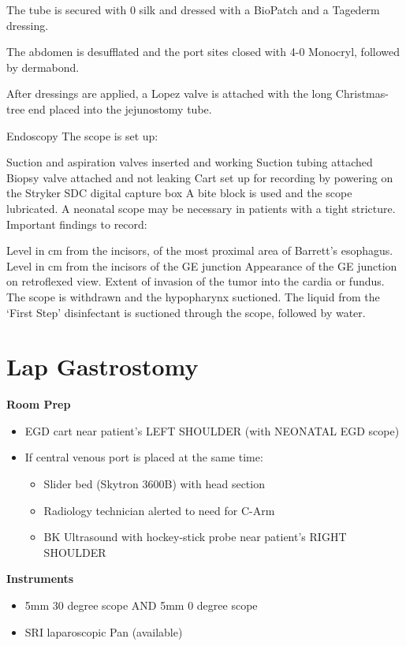 \documentclass[
]{book}
\providecommand{\tightlist}{%
  \setlength{\itemsep}{0pt}\setlength{\parskip}{0pt}}
\begin{document}
The tube is secured with 0 silk and dressed with a BioPatch and a Tagederm dressing.

The abdomen is desufflated and the port sites closed with 4-0 Monocryl, followed by dermabond.

After dressings are applied, a Lopez valve is attached with the long Christmas-tree end placed into the jejunostomy tube.

Endoscopy
The scope is set up:

Suction and aspiration valves inserted and working
Suction tubing attached
Biopsy valve attached and not leaking
Cart set up for recording by powering on the Stryker SDC digital capture box
A bite block is used and the scope lubricated. A neonatal scope may be necessary in patients with a tight stricture. Important findings to record:

Level in cm from the incisors, of the most proximal area of Barrett's esophagus.
Level in cm from the incisors of the GE junction
Appearance of the GE junction on retroflexed view. Extent of invasion of the tumor into the cardia or fundus.
The scope is withdrawn and the hypopharynx suctioned. The liquid from the `First Step' disinfectant is suctioned through the scope, followed by water.

\hypertarget{lap_gastrostomy_salo}{%
\chapter{Lap Gastrostomy}\label{lap_gastrostomy_salo}}

\textbf{Room Prep}

\begin{itemize}
\tightlist
\item
  EGD cart near patient's LEFT SHOULDER (with NEONATAL EGD scope)
\item
  If central venous port is placed at the same time:

  \begin{itemize}
  \tightlist
  \item
    Slider bed (Skytron 3600B) with head section
  \item
    Radiology technician alerted to need for C-Arm
  \item
    BK Ultrasound with hockey-stick probe near patient's RIGHT SHOULDER
  \end{itemize}
\end{itemize}

\textbf{Instruments}

\begin{itemize}
\tightlist
\item
  5mm 30 degree scope AND 5mm 0 degree scope
\item
  SRI laparoscopic Pan (available)
\end{itemize}
\end{document}
